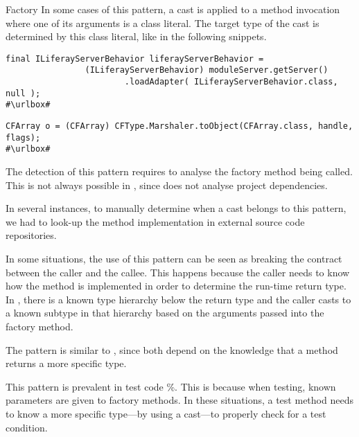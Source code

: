 \begin{pattern}{Factory}
In some cases of this pattern, a cast is applied to a method invocation where one of its arguments is a class literal.
The target type of the cast is determined by this class literal,
like in the following snippets.
\def\urlvar{http://bit.ly/liferay_liferay_ide_2FMG0f6}
\begin{verbatim}
final ILiferayServerBehavior liferayServerBehavior =
                (ILiferayServerBehavior) moduleServer.getServer()
                        .loadAdapter( ILiferayServerBehavior.class, null );
#\urlbox#
\end{verbatim}

\def\urlvar{http://bit.ly/robovm_robovm_2FMFWvS}
\begin{verbatim}
CFArray o = (CFArray) CFType.Marshaler.toObject(CFArray.class, handle, flags);
#\urlbox#
\end{verbatim} 


\detection{}
The detection of this pattern requires to analyse the factory method being called.
This is not always possible in \ql{},
since \ql{} does not analyse project dependencies.

In several instances, to manually determine when a cast belongs to this pattern,
we had to look-up the method implementation in external source code repositories.

\issues{}
In some situations, the use of this pattern can be seen as breaking the contract \api{} between the caller and the callee.
This happens because the caller needs to know how the method is implemented in order to determine the run-time return type.
In \thisp{}, there is a known type hierarchy 
below the return type and the caller casts to a known subtype
in that hierarchy based on the arguments passed into the factory method.

The  pattern is similar to \thisp{},
since both depend on the knowledge that a method returns a more specific type.

This pattern is prevalent in test code \nFactoryPatternTestPerc{}\%.
This is because when testing,
known parameters are given to factory methods.
In these situations, a test method needs to know a more specific type---by using a cast---to properly check for a test condition. 

\end{pattern}
